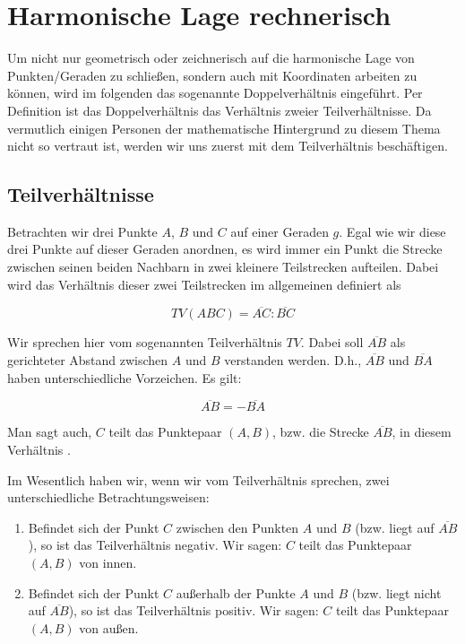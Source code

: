 \documentclass[12pt,a4paper]{article}
\begin{document}
\newpage
\section{Harmonische Lage rechnerisch}
Um nicht nur geometrisch oder zeichnerisch auf die harmonische Lage von Punkten/Geraden zu schließen, sondern auch mit Koordinaten arbeiten zu können, wird im folgenden das sogenannte Doppelverhältnis eingeführt. Per Definition ist das Doppelverhältnis das Verhältnis zweier Teilverhältnisse. Da vermutlich einigen Personen der mathematische Hintergrund zu diesem Thema nicht so vertraut ist, werden wir uns zuerst mit dem Teilverhältnis beschäftigen.

\subsection{Teilverhältnisse}
\label{subsec:teilverh}
Betrachten wir drei Punkte $A$, $B$ und $C$ auf einer Geraden $g$. Egal wie wir diese drei Punkte auf dieser Geraden anordnen, es wird immer ein Punkt die Strecke zwischen seinen beiden Nachbarn in zwei kleinere Teilstrecken aufteilen. Dabei wird das Verhältnis dieser zwei Teilstrecken im allgemeinen definiert als

\[TV(A B C) = \overline{A C} : \overline{B C}\]

Wir sprechen hier vom sogenannten Teilverhältnis $TV$. Dabei soll $\overline{A B}$ als gerichteter Abstand zwischen $A$ und $B$ verstanden werden. D.h., $\overline{A B}$ und $\overline{B A}$ haben unterschiedliche Vorzeichen. Es gilt: 

\[\overline{A B} = -\overline{B A}\]

Man sagt auch, $C$ teilt das Punktepaar $(A , B)$, bzw. die Strecke $\overline{A B}$, in diesem Verhältnis \citep[vgl.][S.~76]{projektiveGeometrie}.

Im Wesentlich haben wir, wenn wir vom Teilverhältnis sprechen, zwei unterschiedliche Betrachtungsweisen:
\begin{enumerate}
\item Befindet sich der Punkt $C$ zwischen den Punkten $A$ und $B$ (bzw. liegt auf $\overline{A B}$), so ist das Teilverhältnis negativ. Wir sagen: $C$ teilt das Punktepaar $(A , B)$ \glqq von innen\grqq .
\item Befindet sich der Punkt $C$ außerhalb der Punkte $A$ und $B$ (bzw. liegt nicht auf $\overline{A B}$), so ist das Teilverhältnis positiv. Wir sagen: $C$ teilt das Punktepaar $(A , B)$ \glqq von außen\grqq .
\end{enumerate}
\end{document}
